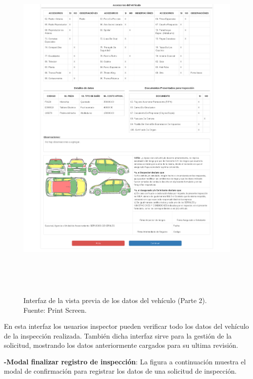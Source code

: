 \begin{figure}[H]
\begin{center}
	\includegraphics[width=\textwidth,height=18cm]{img/interfaces/prev_planilla_2.png}
\end{center}
\caption{Interfaz de la vista previa de los datos del vehículo (Parte 2). Fuente: Print Screen.}
\label{fig:interfaz_vista_previa_vehiculo_2}
\end{figure}

En esta interfaz los usuarios inspector pueden verificar todo los datos del vehículo de la inspección realizada. También dicha interfaz sirve para la gestión de la solicitud, mostrando los datos anteriormente cargados para su ultima revisión.


\textbf{-Modal finalizar registro de inspección}: La figura a continuación muestra el modal de confirmación para registrar los datos de una solicitud de inspección.

